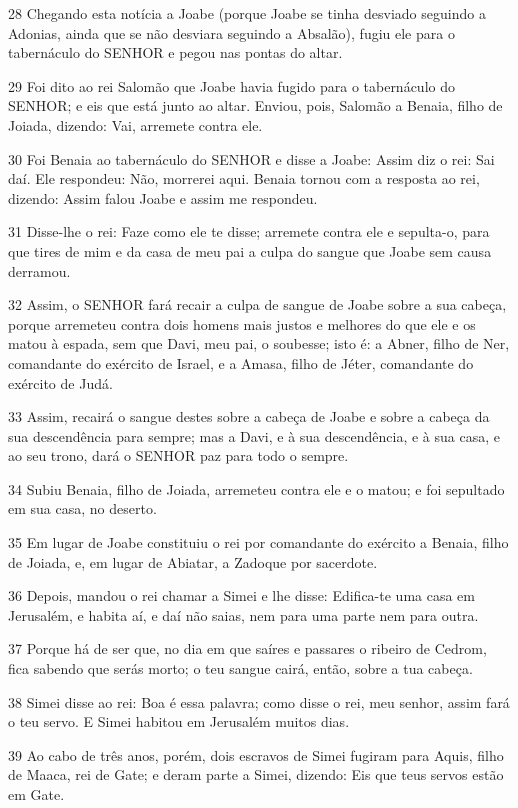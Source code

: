 \par 28 Chegando esta notícia a Joabe (porque Joabe se tinha desviado seguindo a Adonias, ainda que se não desviara seguindo a Absalão), fugiu ele para o tabernáculo do SENHOR e pegou nas pontas do altar.
\par 29 Foi dito ao rei Salomão que Joabe havia fugido para o tabernáculo do SENHOR; e eis que está junto ao altar. Enviou, pois, Salomão a Benaia, filho de Joiada, dizendo: Vai, arremete contra ele.
\par 30 Foi Benaia ao tabernáculo do SENHOR e disse a Joabe: Assim diz o rei: Sai daí. Ele respondeu: Não, morrerei aqui. Benaia tornou com a resposta ao rei, dizendo: Assim falou Joabe e assim me respondeu.
\par 31 Disse-lhe o rei: Faze como ele te disse; arremete contra ele e sepulta-o, para que tires de mim e da casa de meu pai a culpa do sangue que Joabe sem causa derramou.
\par 32 Assim, o SENHOR fará recair a culpa de sangue de Joabe sobre a sua cabeça, porque arremeteu contra dois homens mais justos e melhores do que ele e os matou à espada, sem que Davi, meu pai, o soubesse; isto é: a Abner, filho de Ner, comandante do exército de Israel, e a Amasa, filho de Jéter, comandante do exército de Judá.
\par 33 Assim, recairá o sangue destes sobre a cabeça de Joabe e sobre a cabeça da sua descendência para sempre; mas a Davi, e à sua descendência, e à sua casa, e ao seu trono, dará o SENHOR paz para todo o sempre.
\par 34 Subiu Benaia, filho de Joiada, arremeteu contra ele e o matou; e foi sepultado em sua casa, no deserto.
\par 35 Em lugar de Joabe constituiu o rei por comandante do exército a Benaia, filho de Joiada, e, em lugar de Abiatar, a Zadoque por sacerdote.
\par 36 Depois, mandou o rei chamar a Simei e lhe disse: Edifica-te uma casa em Jerusalém, e habita aí, e daí não saias, nem para uma parte nem para outra.
\par 37 Porque há de ser que, no dia em que saíres e passares o ribeiro de Cedrom, fica sabendo que serás morto; o teu sangue cairá, então, sobre a tua cabeça.
\par 38 Simei disse ao rei: Boa é essa palavra; como disse o rei, meu senhor, assim fará o teu servo. E Simei habitou em Jerusalém muitos dias.
\par 39 Ao cabo de três anos, porém, dois escravos de Simei fugiram para Aquis, filho de Maaca, rei de Gate; e deram parte a Simei, dizendo: Eis que teus servos estão em Gate.
